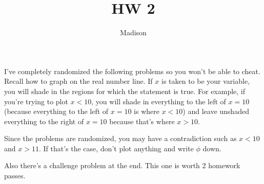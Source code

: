 \documentclass[12pt]{article}
\begin{document}
			\title{HW 2}
			\author{Madison}
			\date{}
			\maketitle
I've completely randomized the following problems so you won't be able to cheat. Recall how to 
graph on the real number line. If $x$ is taken
to be your variable, you will shade in the regions for which the statement is true. For example, if you're
trying to plot $x < 10$, you will shade in everything to the left of $x = 10$ (because everything to the 
left of $x = 10$ is where $x < 10$) and leave unshaded everything to the right of $x = 10$ because that's where
$x > 10$.

Since the problems are randomized, you may have a contradiction such as $x < 10$ and $x > 11$. If that's the case,
don't plot anything and write $\phi$ down.

Also there's a challenge problem at the end. This one is worth 2 homework passes.
\end{document}

